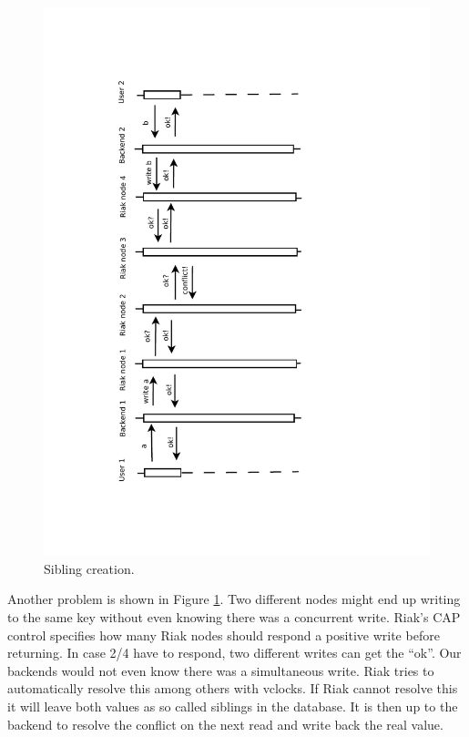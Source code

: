 \documentclass[11pt,a4paper]{report}
\begin{document}
\begin{figure}[htbp!]
 \hspace{-3cm}
 \includegraphics[width=\textwidth, angle=-90]{./graphics/Concurrency_-_Siblings.pdf}
 \vspace{-4cm}
 \caption{Sibling creation.}
 \label{fig:concurrency:siblings}
\end{figure}
Another problem is shown in Figure \ref{fig:concurrency:siblings}.
Two different nodes might end up writing to the same key without even knowing
there was a concurrent write.
Riak's CAP control specifies how many Riak nodes should respond a positive write
before returning.
In case 2/4 have to respond, two different writes can get the ``ok''.
Our backends would not even know there was a simultaneous write.
Riak tries to automatically resolve this among others with vclocks.
If Riak cannot resolve this it will leave both values as so called siblings
in the database.
It is then up to the backend to resolve the conflict on the next read
and write back the real value.
\end{document}
